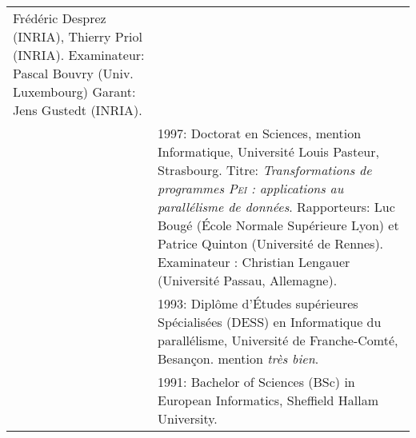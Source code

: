 \begin{tabular}{lp{13.7cm}}
				   		   	Frédéric Desprez (INRIA),
							Thierry Priol (INRIA). 
							Examinateur: Pascal Bouvry (Univ. Luxembourg)
							Garant: Jens Gustedt (INRIA).\\[5mm]
%
			& 1997:  Doctorat en Sciences, mention Informatique, Université Louis Pasteur, Strasbourg.
      			  Titre: {\em Transformations de programmes \textsc{Pei} : applications au parall\'{e}lisme de donn\'{e}es}.
		              Rapporteurs: Luc Bougé (\'{E}cole Normale Supérieure Lyon) et Patrice Quinton (Université de Rennes). Examinateur : Christian Lengauer (Université Passau, Allemagne).\\[2mm]
			& 1993: Diplôme d'\'{E}tudes supérieures Spécialisées (DESS) en Informatique du parallélisme, 
				Université de Franche-Comté, Besançon. mention {\em très bien}.\\[2mm]
			& 1991: Bachelor of Sciences (BSc) in European Informatics, Sheffield Hallam University.\\[5mm]

\end{tabular}



